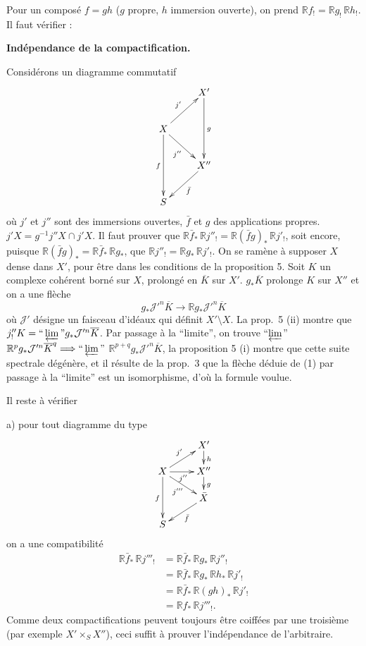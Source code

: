 \documentclass[12pt]{amsart}
\theoremstyle{plain}
\theoremstyle{definition}
\newcommand{\cJ}{\mathcal{J}}
\newcommand{\bR}{\mathbb{R}}
\begin{document}
Pour un compos\'e $f = gh$ ($g$ propre, $h$ immersion ouverte), on prend $\bR f_{!} = \bR g_{!}\,\bR h_{!}$. Il faut v\'erifier :

\medskip

\textbf{Ind\'ependance de la compactification.}

Consid\'erons un diagramme commutatif
\[
\xymatrix{
& X' \ar[dd]^{g} \\
X \ar[ur]^{j'} \ar[dr]_{j''} \ar[dd]_{f} & \\
& X'' \ar[dl]^{\bar{f}} \\
S &
}
\]
o\`u $j'$ et $j''$ sont des immersions ouvertes, $\bar{f}$ et $g$ des applications propres. $j'X = g^{-1}j''X \cap j'X$. Il faut prouver que $\bR\bar{f}_{*}\,\bR j''_{!} = \bR(\bar{f}g)_{*}\,\bR j'_{!}$, soit encore, puisque $\bR(\bar{f}g)_{*} = \bR\bar{f}_{*}\,\bR g_{*}$, que $\bR j''_{!} = \bR g_{*}\,\bR j'_{!}$. On se ram\`ene \`a supposer $X$ dense dans $X'$, pour \^etre dans les conditions de la proposition 5. Soit $K$ un complexe coh\'erent born\'e sur $X$, prolong\'e en $\overline{K}$ sur $X'$. $g_{*}\overline{K}$ prolonge $K$ sur $X''$ et on a une fl\`eche
\begin{equation}
g_{*}\cJ'^{n}\overline{K} \to \bR g_{*}\cJ'^{n}\overline{K}
\end{equation}
o\`u $\cJ'$ d\'esigne un faisceau d'id\'eaux qui d\'efinit $X' \setminus X$. La prop.\ 5 (ii) montre que $j''_{!}K = \text{``}\varprojlim\text{''} g_{*}\cJ'^{n}\overline{K}$. Par passage \`a la ``limite'', on trouve ``$\varprojlim$'' $\bR^{p}g_{*}\cJ'^{n}\overline{K}^{q} \Longrightarrow \text{``}\varprojlim\text{''}$ $\bR^{p+q}g_{*}\cJ'^{n}\overline{K}$, la proposition 5 (i) montre que cette suite spectrale d\'eg\'en\`ere, et il r\'esulte de la prop.\ 3 que la fl\`eche d\'eduie de (1) par passage \`a la ``limite'' est un isomorphisme, d'o\`u la formule voulue.

Il reste \`a v\'erifier

a) pour tout diagramme du type
\[
\xymatrix@C=2.4em@R=1.3em{
& X' \ar[d]^{h} \\
X \ar[ur]^{j'} \ar[r]_{j''} \ar[dr]_{j'''} \ar[dd]_{f} & X'' \ar[d]^{g} \\
& \bar X \ar[dl]^{\bar f} \\
S &
}
\]
on a une compatibilit\'e
\[
\begin{aligned}
\bR\bar{f}_{*}\,\bR j'''_{!}
&= \bR\bar{f}_{*}\,\bR g_{*}\,\bR j''_{!} \\
&= \bR\bar{f}_{*}\,\bR g_{*}\,\bR h_{*}\,\bR j'_{!} \\
&= \bR\bar{f}_{*}\,\bR(gh)_{*}\,\bR j'_{!} \\
&= \bR f_{*}\,\bR j'''_{!}.
\end{aligned}
\]
Comme deux compactifications peuvent toujours \^etre coiff\'ees par une troisi\`eme (par exemple $X' \times_{S} X''$), ceci suffit \`a prouver l'ind\'ependance de l'arbitraire.
\end{document}
